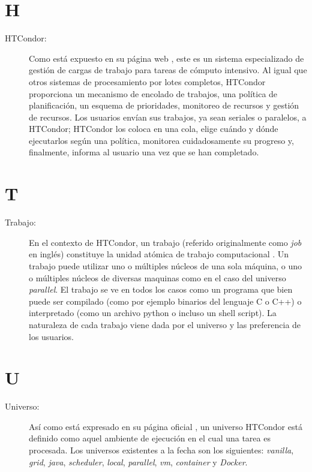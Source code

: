 \section*{H}
\begin{description}
	\item[HTCondor:] Como está expuesto en su página web \citep{HTCondor}, este es un sistema especializado de gestión de cargas de trabajo para tareas de cómputo intensivo. Al igual que otros sistemas de procesamiento por lotes completos, HTCondor proporciona un mecanismo de encolado de trabajos, una política de planificación, un esquema de prioridades, monitoreo de recursos y gestión de recursos. Los usuarios envían sus trabajos, ya sean seriales o paralelos, a HTCondor; HTCondor los coloca en una cola, elige cuándo y dónde ejecutarlos según una política, monitorea cuidadosamente su progreso y, finalmente, informa al usuario una vez que se han completado.
\end{description}

\section*{T}
\begin{description}
	\item [Trabajo:] En el contexto de HTCondor, un trabajo (referido originalmente como \textit{job} en inglés) constituye la unidad atómica de trabajo computacional \citep{HTCondor-what-is-a-job}. Un trabajo puede utilizar uno o múltiples núcleos de una sola máquina, o uno o múltiples núcleos de diversas maquinas como en el caso del universo \textit{parallel}. El trabajo se ve en todos los casos como un programa que bien puede ser compilado (como por ejemplo binarios del lenguaje C o C++) o interpretado (como un archivo python o incluso un shell script). La naturaleza de cada trabajo viene dada por el universo y las preferencia de los usuarios.
\end{description}


\section*{U}
\begin{description}
	\item[Universo:] Así como está expresado en su página oficial \citep{HTCondor}, un universo HTCondor está definido como aquel ambiente de ejecución en el cual una tarea es procesada. Los universos existentes a la fecha son los siguientes: \textit{vanilla}, \textit{grid}, \textit{java}, \textit{scheduler}, \textit{local}, \textit{parallel}, \textit{vm}, \textit{container} y \textit{Docker}.
\end{description}